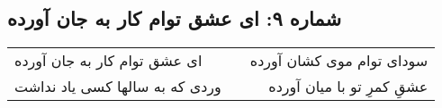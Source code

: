 \begin{center}
\section*{شماره ۹: ای عشق توام کار به جان آورده}
\label{sec:009}
\begin{longtable}{l p{0.5cm} r}
ای عشق توام کار به جان آورده
&&
سودای توام موی کشان آورده
\\
وردی که به سالها کسی یاد نداشت
&&
عشقِ کمرِ تو با میان آورده
\\
\end{longtable}
\end{center}
